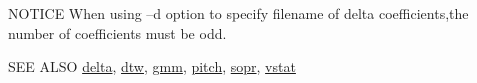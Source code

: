 \begin{qsection}{NOTICE}
When using --d option to specify filename of delta coefficients,the
number of coefficients must be odd.
\end{qsection}

\begin{qsection}{SEE ALSO}
\hyperlink{delta}{delta},
\hyperlink{dtw}{dtw},
\hyperlink{gmm}{gmm},
\hyperlink{pitch}{pitch},
\hyperlink{sopr}{sopr},
\hyperlink{vstat}{vstat}
\end{qsection}
